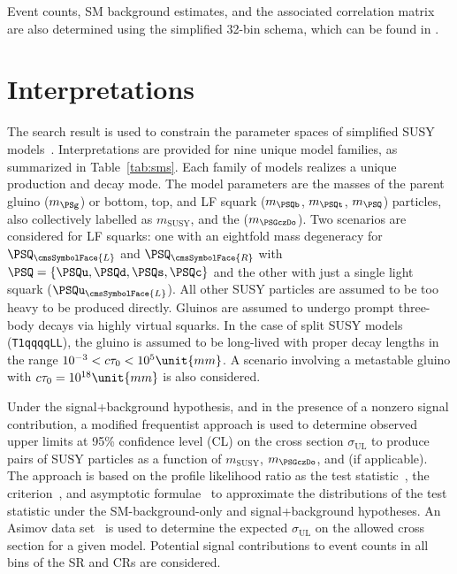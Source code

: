 Event counts, SM background estimates, and the associated correlation
matrix are also determined using the simplified 32-bin schema, which
can be found in \suppMaterial. 


\section{Interpretations}
\label{sec:interpretations}

The search result is used to constrain the parameter spaces of
simplified SUSY models~\cite{Alwall:2008ag, Alwall:2008va,
  sms}. Interpretations are provided for nine unique model families,
as summarized in Table~\ref{tab:sms}. Each family of models realizes a
unique production and decay mode. The model parameters are the masses
of the parent gluino ($m_\PSg$) or bottom, top, and LF squark
($m_{\PSQb}$, $m_{\PSQt}$, $m_{\PSQ}$) particles, also collectively
labelled as $m_\text{SUSY}$, and the \PSGczDo ($m_{\PSGczDo}$). Two
scenarios are considered for LF squarks: one with an eightfold mass
degeneracy for $\PSQ_\cmsSymbolFace{L}$ and $\PSQ_\cmsSymbolFace{R}$
with $\PSQ = \{\PSQu, \PSQd, \PSQs, \PSQc\}$ and the other with just a
single light squark ($\PSQu_\cmsSymbolFace{L}$). All other SUSY
particles are assumed to be too heavy to be produced directly. Gluinos
are assumed to undergo prompt three-body decays via highly virtual
squarks. In the case of split SUSY models (\texttt{T1qqqqLL}), the
gluino is assumed to be long-lived with proper decay lengths in the
range $10^{-3} < \ctau < 10^{5}\unit{mm}$. A scenario involving a
metastable gluino with $\ctau = 10^{18}\unit{mm}$ is also considered.

Under the signal+background hypothesis, and in the presence of a
nonzero signal contribution, a modified frequentist approach is used
to determine observed upper limits at 95\% confidence level (CL) on
the cross section $\sigma_\text{UL}$ to produce pairs of SUSY
particles as a function of $m_\text{SUSY}$, $m_{\PSGczDo}$, and \ctau
(if applicable). The approach is based on the %
profile likelihood ratio as the test
statistic~\cite{CMS-NOTE-2011-005}, the \cls criterion~\cite{junk,
  read}, and asymptotic formulae~\cite{Cowan:2010js} to approximate
the distributions of the test statistic under the SM-background-only
and signal+background hypotheses.  An Asimov data
set~\cite{Cowan:2010js} is used to determine the expected
$\sigma_\text{UL}$ on the allowed cross section for a given
model. Potential signal contributions to event counts in all bins of
the SR and CRs are considered.%

